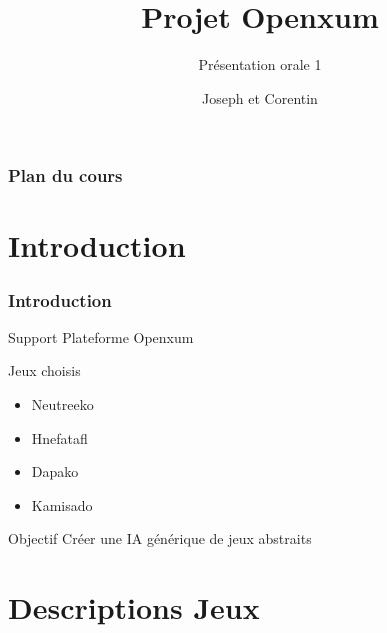 \documentclass[11pt]{beamer}
\begin{document}
	
\author[J.Delaeter C.Ghyselinck]{Joseph  et Corentin }
\title{Projet Openxum}
\subtitle{Présentation orale 1}

  \begin{frame}
  \maketitle
  \end{frame}

  \begin{frame}
	\frametitle{Plan du cours}
	\tableofcontents
	\end{frame}
\section[Introduction]{Introduction}
  \begin{frame}
  \frametitle{Introduction}
  
  
  \begin{block}{Support}
  	Plateforme Openxum
  \end{block}

  \begin{block}{Jeux choisis}
	
	\begin{itemize}
		\item Neutreeko
		\item Hnefatafl
		\item Dapako
		\item Kamisado
	\end{itemize}
\end{block}
  
  \begin{alertblock}{Objectif}
  	Créer une IA générique de jeux abstraits 
  	\end{alertblock}
\end{frame}
\section[Description Jeux]{Descriptions Jeux} 
\end{document}
